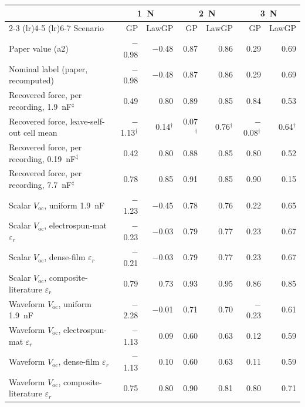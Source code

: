 \begin{tabular}{l rr rr rr}
\toprule
 & \multicolumn{2}{c}{\SI{1}{\newton}} & \multicolumn{2}{c}{\SI{2}{\newton}} & \multicolumn{2}{c}{\SI{3}{\newton}} \\
\cmidrule(lr){2-3} \cmidrule(lr){4-5} \cmidrule(lr){6-7}
Scenario & GP & LawGP & GP & LawGP & GP & LawGP \\
\midrule
Paper value (a2) & $-$0.98 & $-$0.48 & 0.87 & 0.86 & 0.29 & 0.69 \\
Nominal label (paper, recomputed) & $-$0.98 & $-$0.48 & 0.87 & 0.86 & 0.29 & 0.69 \\
Recovered force, per recording, \SI{1.9}{\nano\farad}$^\ddagger$ & 0.49 & 0.80 & 0.89 & 0.85 & 0.84 & 0.53 \\
Recovered force, leave-self-out cell mean & $-$1.13$^\dagger$ & 0.14$^\dagger$ & 0.07$^\dagger$ & 0.76$^\dagger$ & $-$0.08$^\dagger$ & 0.64$^\dagger$ \\
Recovered force, per recording, \SI{0.19}{\nano\farad}$^\ddagger$ & 0.42 & 0.80 & 0.88 & 0.85 & 0.80 & 0.52 \\
Recovered force, per recording, \SI{7.7}{\nano\farad}$^\ddagger$ & 0.78 & 0.85 & 0.91 & 0.85 & 0.90 & 0.15 \\
Scalar $V_\mathrm{oc}$, uniform \SI{1.9}{\nano\farad} & $-$1.23 & $-$0.45 & 0.78 & 0.76 & 0.22 & 0.65 \\
Scalar $V_\mathrm{oc}$, electrospun-mat $\varepsilon_r$ & $-$0.23 & $-$0.03 & 0.79 & 0.77 & 0.23 & 0.67 \\
Scalar $V_\mathrm{oc}$, dense-film $\varepsilon_r$ & $-$0.21 & $-$0.03 & 0.79 & 0.77 & 0.23 & 0.67 \\
Scalar $V_\mathrm{oc}$, composite-literature $\varepsilon_r$ & 0.79 & 0.73 & 0.93 & 0.95 & 0.86 & 0.85 \\
Waveform $V_\mathrm{oc}$, uniform \SI{1.9}{\nano\farad} & $-$2.28 & $-$0.01 & 0.71 & 0.70 & $-$0.23 & 0.61 \\
Waveform $V_\mathrm{oc}$, electrospun-mat $\varepsilon_r$ & $-$1.13 & 0.09 & 0.60 & 0.63 & 0.12 & 0.59 \\
Waveform $V_\mathrm{oc}$, dense-film $\varepsilon_r$ & $-$1.13 & 0.10 & 0.60 & 0.63 & 0.11 & 0.59 \\
Waveform $V_\mathrm{oc}$, composite-literature $\varepsilon_r$ & 0.75 & 0.80 & 0.90 & 0.81 & 0.80 & 0.71 \\
\bottomrule
\end{tabular}
